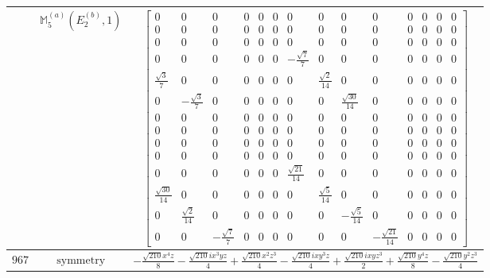 \documentclass[fleqn,8pt,landscape]{jsarticle}
\begin{document}
\begin{longtable}{ccc}
$  $ & $ \mathbb{M}_{5}^{(a)}(E_{2}^{(b)},1) $ & $ \begin{bmatrix} 0 & 0 & 0 & 0 & 0 & 0 & 0 & 0 & 0 & 0 & 0 & 0 & 0 & 0 \\ 0 & 0 & 0 & 0 & 0 & 0 & 0 & 0 & 0 & 0 & 0 & 0 & 0 & 0 \\ 0 & 0 & 0 & 0 & 0 & 0 & 0 & 0 & 0 & 0 & 0 & 0 & 0 & 0 \\ 0 & 0 & 0 & 0 & 0 & 0 & - \frac{\sqrt{7}}{7} & 0 & 0 & 0 & 0 & 0 & 0 & 0 \\ \frac{\sqrt{3}}{7} & 0 & 0 & 0 & 0 & 0 & 0 & \frac{\sqrt{2}}{14} & 0 & 0 & 0 & 0 & 0 & 0 \\ 0 & - \frac{\sqrt{3}}{7} & 0 & 0 & 0 & 0 & 0 & 0 & \frac{\sqrt{30}}{14} & 0 & 0 & 0 & 0 & 0 \\ 0 & 0 & 0 & 0 & 0 & 0 & 0 & 0 & 0 & 0 & 0 & 0 & 0 & 0 \\ 0 & 0 & 0 & 0 & 0 & 0 & 0 & 0 & 0 & 0 & 0 & 0 & 0 & 0 \\ 0 & 0 & 0 & 0 & 0 & 0 & 0 & 0 & 0 & 0 & 0 & 0 & 0 & 0 \\ 0 & 0 & 0 & 0 & 0 & 0 & 0 & 0 & 0 & 0 & 0 & 0 & 0 & 0 \\ 0 & 0 & 0 & 0 & 0 & 0 & \frac{\sqrt{21}}{14} & 0 & 0 & 0 & 0 & 0 & 0 & 0 \\ \frac{\sqrt{30}}{14} & 0 & 0 & 0 & 0 & 0 & 0 & \frac{\sqrt{5}}{14} & 0 & 0 & 0 & 0 & 0 & 0 \\ 0 & \frac{\sqrt{2}}{14} & 0 & 0 & 0 & 0 & 0 & 0 & - \frac{\sqrt{5}}{14} & 0 & 0 & 0 & 0 & 0 \\ 0 & 0 & - \frac{\sqrt{7}}{7} & 0 & 0 & 0 & 0 & 0 & 0 & - \frac{\sqrt{21}}{14} & 0 & 0 & 0 & 0 \end{bmatrix} $ \\ \hline
$ 967 $ & $ \text{symmetry} $ & $ - \frac{\sqrt{210} x^{4} z}{8} - \frac{\sqrt{210} i x^{3} y z}{4} + \frac{\sqrt{210} x^{2} z^{3}}{4} - \frac{\sqrt{210} i x y^{3} z}{4} + \frac{\sqrt{210} i x y z^{3}}{2} + \frac{\sqrt{210} y^{4} z}{8} - \frac{\sqrt{210} y^{2} z^{3}}{4} $ \\

\end{longtable}
\end{document}
